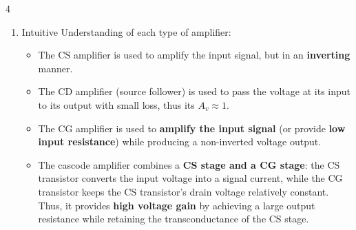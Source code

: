 \documentclass[10pt, landscape]{article}
\begin{document}
\begin{multicols}{4}
\begin{enumerate}
    \item Intuitive Understanding of each type of amplifier:
    \begin{itemize}
        \item The CS amplifier is used to amplify the input signal, but in an \textbf{inverting} manner.
        \item The CD amplifier (source follower) is used to pass the voltage at its input to its output with small loss, thus its $A_v\approx 1$.
        \item The CG amplifier is used to \textbf{amplify the input signal} (or provide \textbf{low input resistance}) while producing a non-inverted voltage output.
        \item The cascode amplifier combines a \textbf{CS stage and a CG stage}: the CS transistor converts the input voltage into a signal current, while the CG transistor keeps the CS transistor's drain voltage relatively constant. Thus, it provides \textbf{high voltage gain} by achieving a large output resistance while retaining the transconductance of the CS stage.
    \end{itemize}
\end{enumerate}


\end{multicols}
\end{document}
